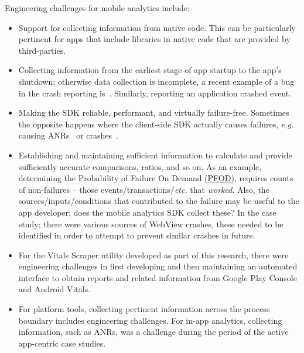 Engineering challenges for mobile analytics include:
\begin{itemize}
    \item Support for collecting information from native code. This can be particularly pertinent for apps that include libraries in native code that are provided by third-parties.
    \item Collecting information from the earliest stage of app startup to the app's shutdown; otherwise data collection is incomplete, a recent example of a bug in the crash reporting is~. Similarly, reporting an application crashed  event.
    \item Making the SDK reliable, performant, and virtually failure-free. Sometimes the opposite happens where the client-side SDK actually causes failures, \emph{e.g.} causing ANRs~ or crashes~.
    \item Establishing and maintaining sufficient information to calculate and provide sufficiently accurate comparisons, ratios, and so on. As an example, determining the Probability of Failure On Demand (\href{glossary-pfod}{PFOD}), requires counts of non-failures -- those events/transactions/\emph{etc.} that \emph{worked}. Also, the sources/inputs/conditions that contributed to the failure may be useful to the app developer; does the mobile analytics SDK collect these? In the  case study; there were various sources of WebView crashes, these needed to be identified in order to attempt to prevent similar crashes in future.
    \item For the Vitals Scraper utility developed as part of this research, there were engineering challenges in first developing and then maintaining an automated interface to obtain reports and related information from Google Play Console and Android Vitals.
    \item For platform tools, collecting pertinent information across the process boundary includes engineering challenges. For in-app analytics, collecting information, such as ANRs, was a challenge during the period of the active app-centric case studies. 
\end{itemize}

